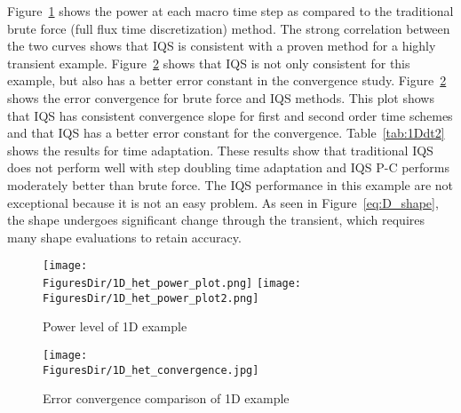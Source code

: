\documentclass[12pt]{scrartcl}
\newcommand{\fig}[1]{Figure~\ref{#1}}                      %
\newcommand{\tbl}[1]{Table~\ref{#1}}                     %
\newcommand{\FiguresDir}{./figs}
\begin{document}
\fig{fig:power} shows the power at each macro time step as compared to the traditional brute force (full flux time discretization) method.  The strong correlation between the two curves shows that IQS is consistent with a proven method for a highly transient example.  \fig{fig:conv} shows that IQS is not only consistent for this example, but also has a better error constant in the convergence study.  \fig{fig:conv} shows the error convergence for brute force and IQS methods.  This plot shows that IQS has consistent convergence slope for first and second order time schemes and that IQS has a better error constant for the convergence.  \tbl{tab:1Ddt2} shows the results for time adaptation.  These results show that traditional IQS does not perform well with step doubling time adaptation and IQS P-C performs moderately better than brute force.  The IQS performance in this example are not exceptional because it is not an easy problem.  As seen in \fig{eq:D_shape}, the shape undergoes significant change through the transient, which requires many shape evaluations to retain accuracy.

\begin{figure}[!htbp]
\centering
\texttt{[image: \\FiguresDir/1D\_het\_power\_plot.png]}
\texttt{[image: \\FiguresDir/1D\_het\_power\_plot2.png]}
\caption{Power level of 1D example}
\label{fig:power}
\end{figure}

\begin{figure}[!htbp]
\centering
\texttt{[image: \\FiguresDir/1D\_het\_convergence.jpg]}
\caption{Error convergence comparison of 1D example}
\label{fig:conv}
\end{figure}
\end{document}
